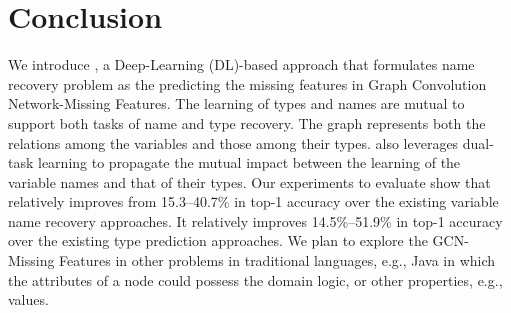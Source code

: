 \section{Conclusion}
\label{sec:conclusion}

We introduce {\tool}, a Deep-Learning (DL)-based approach that
formulates name recovery problem as the predicting the missing
features in Graph Convolution Network-Missing Features.  The learning
of types and names are mutual to support both tasks of name and type
recovery.  The graph represents both the relations among the variables
and those among their types. {\tool} also leverages dual-task learning
to propagate the mutual impact between the learning of the variable
names and that of their types. Our experiments to evaluate {\tool}
show that
{\tool} relatively improves from 15.3--40.7\% in top-1
accuracy over the existing variable name recovery approaches.
It relatively improves 14.5\%--51.9\% in top-1 accuracy over the
existing type prediction approaches.
We plan to explore the
GCN-Missing Features in other problems in traditional languages, e.g.,
Java in which the attributes of a node could possess the domain logic,
or other properties, e.g., values.
